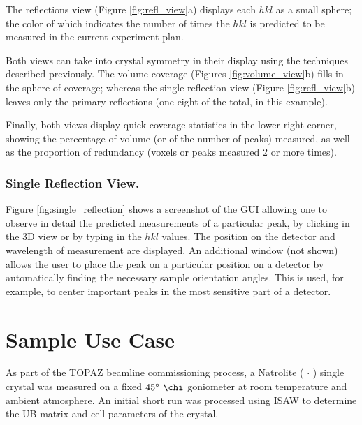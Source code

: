 \documentclass[draft]{iucr}              %
\begin{document}
The reflections view (Figure \ref{fig:refl_view}a) displays each $hkl$ as a
small sphere; the color of which indicates the number of times the $hkl$ is
predicted to be measured in the current experiment plan.        

Both views can take into crystal symmetry in their display using the techniques
described previously. 
The volume coverage (Figures \ref{fig:volume_view}b) fills in the sphere of
coverage; 
whereas the single reflection view (Figure \ref{fig:refl_view}b) leaves only
the primary reflections (one eight of the total, in this example).
 
Finally, both views display quick coverage statistics in the lower right
corner, showing the percentage of volume (or of the number of peaks) measured,
as well as the proportion of redundancy (voxels or peaks measured 2 or more
times). 

\subsubsection{Single Reflection View.}
Figure \ref{fig:single_reflection} shows a screenshot of the GUI allowing one to
observe in detail the predicted measurements of a particular peak, by clicking
in the 3D view or by typing in the $hkl$ values. The position on the detector
and wavelength of measurement are displayed. An additional window (not shown) allows the user to place the peak on a particular
position on a detector by automatically finding the necessary sample orientation
angles. This is used, for example, to center important peaks in the most
sensitive part of a detector.



\section{Sample Use Case}

As part of the TOPAZ beamline commissioning process, a Natrolite
( $\cdot$ ) single crystal was measured on a fixed
$45\degree\ \chi$ goniometer at room temperature and ambient atmosphere. An initial short run was processed using
ISAW to determine the UB matrix and cell parameters of the crystal. 
\end{document}
